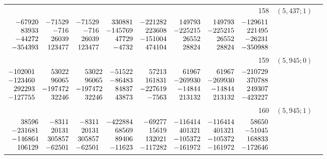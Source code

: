 \documentclass[11pt]{article}
\theoremstyle{remark}
\numberwithin{equation}{section}
\begin{document}
\begin{longtable}{rcl}
158 & $(5,437;1)$ & \begin{tabular}[t]{@{}l@{}}$w_i=\displaystyle \frac{10185159341417010557}{6587923155239780652720000000000000000}$\\[3pt]{\scriptsize$\begin{array}{@{}rrrrrrrr@{}}-67920 & -71529 & -71529 & 330881 & -221282 & 149793 & 149793 & -129611\\83933 & -716 & -716 & -145769 & 223608 & -225215 & -225215 & 221495\\-44272 & 26039 & 26039 & 47729 & -151004 & 26552 & 26552 & -26231\\-354393 & 123477 & 123477 & -4732 & 474104 & 28824 & 28824 & -350988\end{array}$}\end{tabular}\\[8pt]
159 & $(5,945;0)$ & \begin{tabular}[t]{@{}l@{}}$w_i=\displaystyle \frac{200607639057790431}{183403343487966162944000000000000000}$\\[3pt]{\scriptsize$\begin{array}{@{}rrrrrrrr@{}}-102001 & 53022 & 53022 & -51522 & 57213 & 61967 & 61967 & -210729\\-123460 & 96065 & 96065 & -86483 & 161831 & -269930 & -269930 & 370788\\292293 & -197472 & -197472 & 84837 & -227619 & -14844 & -14844 & 249307\\-127755 & 32246 & 32246 & 43873 & -7563 & 213132 & 213132 & -423227\end{array}$}\end{tabular}\\[8pt]
160 & $(5,945;1)$ & \begin{tabular}[t]{@{}l@{}}$w_i=\displaystyle \frac{2111976310256997093}{3214419668485395717580000000000000000}$\\[3pt]{\scriptsize$\begin{array}{@{}rrrrrrrr@{}}38596 & -8311 & -8311 & -422884 & -69277 & -116414 & -116414 & 58650\\-231681 & 20131 & 20131 & 68569 & 15619 & 401321 & 401321 & -51045\\-146864 & 305857 & 305857 & 89406 & 132021 & -105372 & -105372 & 168833\\106129 & -62501 & -62501 & -11623 & -117282 & -161972 & -161972 & -172646\end{array}$}\end{tabular}\\[8pt]

\end{longtable}
\end{document}
